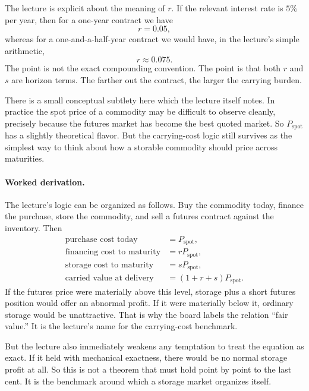 The lecture is explicit about the meaning of $r$. If the relevant interest rate is $5\%$ per year, then for a one-year contract we have
\begin{equation}
r=0.05,
\end{equation}
whereas for a one-and-a-half-year contract we would have, in the lecture's simple arithmetic,
\begin{equation}
r\approx 0.075.
\end{equation}
The point is not the exact compounding convention. The point is that both $r$ and $s$ are horizon terms. The farther out the contract, the larger the carrying burden.

There is a small conceptual subtlety here which the lecture itself notes. In practice the spot price of a commodity may be difficult to observe cleanly, precisely because the futures market has become the best quoted market. So $P_{\text{spot}}$ has a slightly theoretical flavor. But the carrying-cost logic still survives as the simplest way to think about how a storable commodity should price across maturities.

\paragraph{Worked derivation.} The lecture's logic can be organized as follows. Buy the commodity today, finance the purchase, store the commodity, and sell a futures contract against the inventory. Then
\begin{align}
\text{purchase cost today} &= P_{\text{spot}},\\
\text{financing cost to maturity} &= rP_{\text{spot}},\\
\text{storage cost to maturity} &= sP_{\text{spot}},\\
\text{carried value at delivery} &= (1+r+s)P_{\text{spot}}.
\end{align}
If the futures price were materially above this level, storage plus a short futures position would offer an abnormal profit. If it were materially below it, ordinary storage would be unattractive. That is why the board labels the relation ``fair value.'' It is the lecture's name for the carrying-cost benchmark.

But the lecture also immediately weakens any temptation to treat the equation as exact. If it held with mechanical exactness, there would be no normal storage profit at all. So this is not a theorem that must hold point by point to the last cent. It is the benchmark around which a storage market organizes itself.

